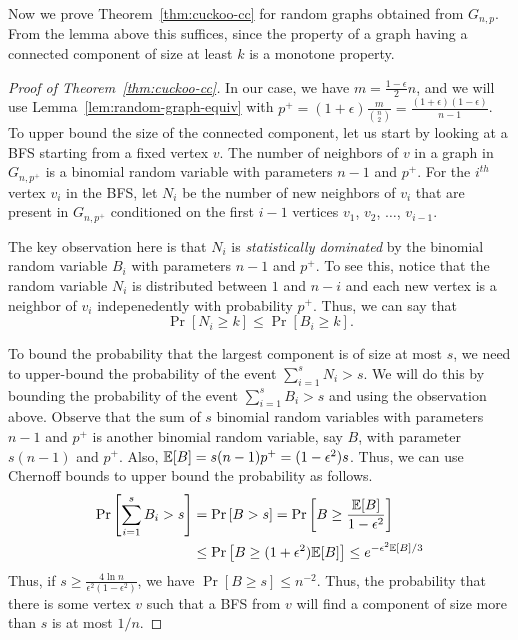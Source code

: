Now we prove Theorem~\ref{thm:cuckoo-cc} for random graphs obtained from
$G_{n,p}$. From the lemma above this suffices, since the property of a graph
having a connected component of size at least $k$ is a monotone property.

\begin{proof}
  [Proof of Theorem~\ref{thm:cuckoo-cc}]
  In our case, we have $m = \frac{1-\epsilon}{2} n$, and we will use
  Lemma~\ref{lem:random-graph-equiv} with
  $p^+ = (1+\epsilon) \frac{m}{\binom{n}{2}} =
  \frac{(1+\epsilon)(1-\epsilon)}{n-1}$. To upper bound the size of the
  connected component, let us start by looking at a BFS starting from a fixed
  vertex $v$. The number of neighbors of $v$ in a graph in $G_{n,p^+}$ is a
  binomial random variable with parameters $n-1$ and $p^+$. For the $i^{th}$
  vertex $v_i$ in the BFS, let $N_i$ be the number of new neighbors of $v_i$ that
  are present in $G_{n,p^+}$ conditioned on the first $i-1$ vertices $v_1$,
  $v_2$, $\ldots$, $v_{i-1}$.

  The key observation here is that $N_i$ is \emph{statistically dominated} by
  the binomial random variable $B_i$ with parameters $n-1$ and $p^+$. To see
  this, notice that the random variable $N_i$ is distributed between $1$ and
  $n-i$ and each new vertex is a neighbor of $v_i$ indepenedently with
  probability $p^+$. Thus, we can say that
  $$\Pr[N_i \geq k] \leq \Pr[B_i \geq k].$$

  To bound the probability that the largest component is of size at most $s$, we
  need to upper-bound the probability of the event $\sum_{i=1}^s N_i > s$. We
  will do this by bounding the probability of the event $\sum_{i=1}^s B_i > s$
  and using the observation above.   Observe that the sum of $s$ binomial
  random variables with parameters $n-1$ and $p^+$ is another binomial random
  variable, say $B$, with parameter $s(n-1)$ and $p^+$. Also,
  $\mathbb{E}[B] = s(n-1)p^+ = (1-\epsilon^2) s$. Thus, we can use Chernoff bounds to
  upper bound the probability as follows.
  \begin{align*}
    \Pr\left[\sum_{i=1}^s B_i > s  \right] &= \Pr\left[ B > s \right] = \Pr\left[ B \geq \frac{\mathbb{E}[B]}{1-\epsilon^2}  \right]\\
    &\leq \Pr\left[ B \geq (1+\epsilon^2)\mathbb{E}[B] \right] \leq e^{-\epsilon^2 \mathbb{E}[B]/3}
  \end{align*}
  Thus, if $s \geq \frac{4\ln n}{\epsilon^2 (1-\epsilon^2)}$, we have
  $\Pr[B \geq s] \leq n^{-2}$. Thus, the probability that there is some vertex
  $v$ such that a BFS from $v$ will find a component of size more than $s$ is at
  most $1/n$.


\end{proof}
